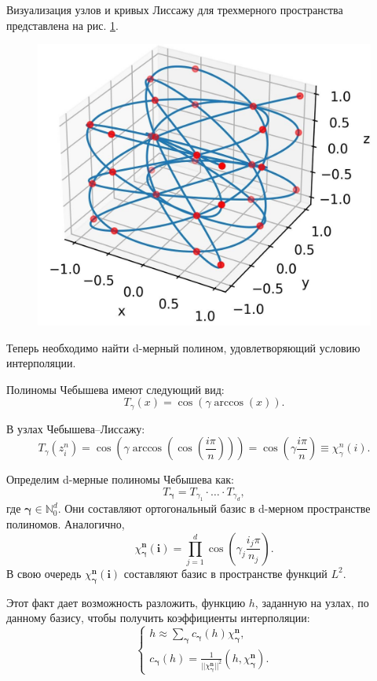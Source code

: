 Визуализация узлов и кривых Лиссажу для трехмерного пространства представлена на рис. \ref{fig:chebLis}.

\begin{figure}[h!]
    \centering
    \includegraphics[width=0.5\linewidth]{../images/solution/chebLis.png}
    \label{fig:chebLis}
\end{figure}

Теперь необходимо найти d-мерный полином, удовлетворяющий условию интерполяции.

Полиномы Чебышева имеют следующий вид:
\begin{equation*}
    T_{\gamma} (x) = \cos (\gamma \arccos (x)).
\end{equation*}

В узлах Чебышева--Лиссажу:
\begin{equation*}
    T_{\gamma} (z^n_i) = \cos \left(\gamma \arccos \left(\cos \left(\frac{i \pi}{n}\right) \right)\right)
     = \cos(\gamma \frac{i \pi}{n}) \equiv \chi_{\gamma}^n (i).
\end{equation*}

Определим d-мерные полиномы Чебышева как:
\begin{equation*}
    T_{\mathbf{\gamma}} = T_{\gamma_1} \cdot \dots \cdot T_{\gamma_d},
\end{equation*}
где $\mathbf{\gamma} \in \mathbb{N}^d_0$.
Они составляют ортогональный базис в d-мерном пространстве полиномов. Аналогично,
\begin{equation*}
    \chi_{\mathbf{\gamma}}^{\mathbf{n}} (\mathbf{i}) = \prod_{j=1}^{d} \cos(\gamma_j \frac{i_j \pi}{n_j}).
\end{equation*}
В свою очередь $\chi_{\mathbf{\gamma}}^{\mathbf{n}} (\mathbf{i})$ составляют базис в пространстве
функций $L^2$.

Этот факт дает возможность разложить, функцию $h$, заданную на узлах, по данному базису, чтобы
получить коэффициенты интерполяции:
\begin{equation*}
    \begin{cases*}
        h \approx \sum_{\mathbf{\gamma}} c_{\mathbf{\gamma}} (h) \chi_{\mathbf{\gamma}}^{\mathbf{n}}, \\
        c_{\mathbf{\gamma}} (h) = \frac{1}{|| \chi_{\mathbf{\gamma}}^{\mathbf{n}} ||^2}
        \left(h, \chi_{\mathbf{\gamma}}^{\mathbf{n}}\right).
    \end{cases*}
\end{equation*}

